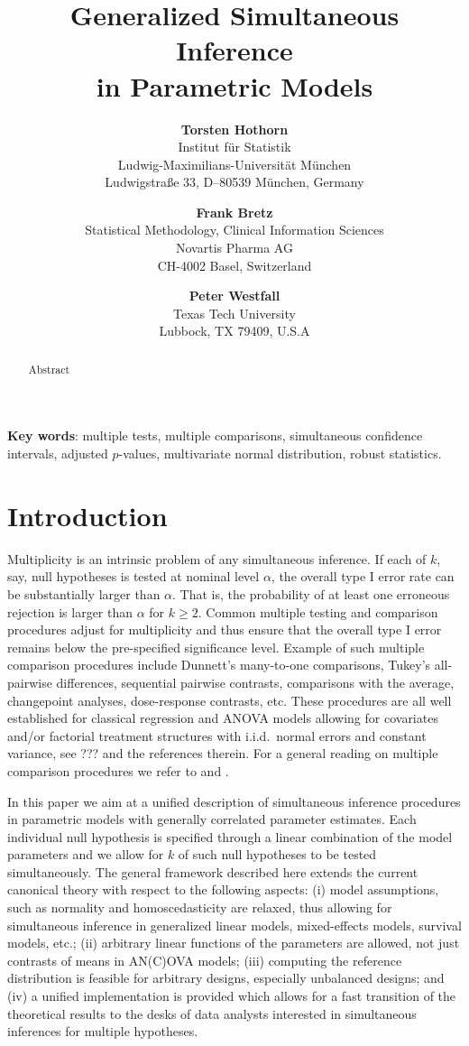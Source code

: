 \documentclass[12pt]{article}
\title{Generalized Simultaneous Inference \\ in Parametric Models}
\author{\textbf{Torsten Hothorn} \\
Institut f{\"u}r Statistik \\
Ludwig-Maximilians-Universit{\"a}t M{\"u}nchen \\
Ludwigstra{\ss}e 33, D--80539 M{\"u}nchen, Germany\\
\and \textbf{Frank Bretz} \\
Statistical Methodology, Clinical Information Sciences\\
Novartis Pharma AG \\
CH-4002 Basel, Switzerland \\
\and \textbf{Peter Westfall} \\
Texas Tech University \\
Lubbock, TX 79409, U.S.A}
\begin{document}
\maketitle
\thispagestyle{empty}
\setcounter{page}{0}

\begin{abstract}
Abstract
\end{abstract}

\textbf{Key words}: multiple tests, multiple comparisons, simultaneous 
confidence intervals,
adjusted $p$-values, multivariate normal distribution, robust statistics.

\newpage

\section{Introduction}

Multiplicity is an intrinsic problem of any simultaneous inference. 
If each of $k$, say, null hypotheses is tested at nominal level $\alpha$, 
the overall type I error rate can be substantially larger than $\alpha$.
That is, the probability of at least one erroneous rejection is larger than $\alpha$ for 
$k \geq 2$. Common multiple testing and comparison procedures adjust for multiplicity and thus 
ensure that the overall type I error remains below the pre-specified significance level.
Example of such multiple comparison procedures include Dunnett's many-to-one comparisons,
Tukey's all-pairwise differences, sequential pairwise contrasts, comparisons with the 
average, changepoint analyses, dose-response contrasts, etc. These procedures are
all well established for classical regression and ANOVA models allowing for covariates 
and/or factorial treatment structures with i.i.d.~normal errors and constant 
variance, see ??? and the references therein. For a general reading 
on multiple comparison procedures we refer to 
\cite{HochbergTamhane1987} and \cite{Hsu1996}.

In this paper we aim at a unified description of simultaneous
inference procedures in parametric models with generally correlated parameter estimates.
Each individual null hypothesis is specified through a linear
combination of the model parameters and we allow
for $k$ of such null hypotheses to be tested simultaneously.
The general framework described here extends the current canonical theory 
with respect to the following aspects: (i) model assumptions, such as normality 
and homoscedasticity
are relaxed, thus allowing for simultaneous inference
in generalized linear models, mixed-effects models,
survival models, etc.; (ii) arbitrary linear functions of the
parameters are allowed, not just contrasts of means in AN(C)OVA models; (iii)
computing the reference distribution is feasible for arbitrary designs,
especially unbalanced designs; and (iv)
a unified implementation is provided which allows for a fast transition of the
theoretical results to the desks of data analysts interested
in simultaneous inferences for multiple hypotheses.
\end{document}
